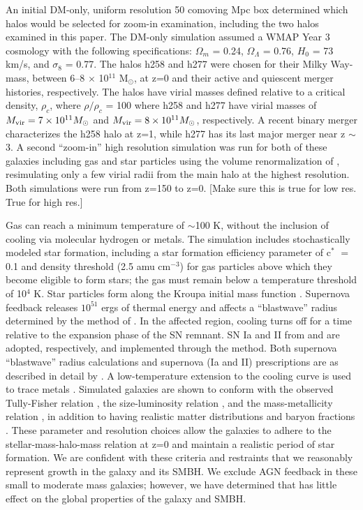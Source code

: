 \documentclass[manuscript]{aastex}
\begin{document}
An initial DM-only, uniform resolution 50 comoving Mpc box determined which halos would be selected for zoom-in examination, including the two halos examined in this paper. The DM-only simulation assumed a WMAP Year 3 cosmology \citep{Spergel2007} with the following specifications: $\Omega _m$ = 0.24, $\Omega _{\Lambda}$ = 0.76, $H_0$ = 73 km/s, and $\sigma _8$ = 0.77. The halos h258 and h277  were chosen for their Milky Way-mass, between 6--8 $\times$ 10$^{11}$  M$_{\odot}$, at z=0 and their active and quiescent merger histories, respectively. The halos have virial masses defined relative to a critical density, $\rho _c$, where $\rho / \rho _c$ = 100 where h258 and h277 have virial masses of $M_{\rm vir} = 7 \times 10^{11} M_{\odot}$ and $M_{\rm vir} = 8 \times 10^{11} M_{\odot}$, respectively. A recent binary merger characterizes the h258 halo at z=1, while h277 has its last major merger near z $\sim$ 3. A second ``zoom-in'' high resolution simulation was run for both of these galaxies including gas and star particles using the volume renormalization of \cite{Katz1993}, resimulating only a few virial radii from the main halo at the highest resolution. Both simulations were run from z=150 to z=0.  [Make sure this is true for low res. True for high res.]

Gas can reach a minimum temperature of $\sim$100 K, without the inclusion of cooling via molecular hydrogen or metals. The simulation includes stochastically modeled star formation, including a star formation efficiency parameter of c$^*$ $=$ 0.1 and density threshold (2.5 amu cm$^{-3}$) for gas particles above which they become eligible to form stars; the gas must remain below a temperature threshold of 10$^4$ K. Star particles form along the Kroupa initial mass function \citep{Kroupa2001}. Supernova feedback releases $10^{51}$ ergs of thermal energy and affects a ``blastwave'' radius determined by the method of \cite{Ostriker1988}. In the affected region, cooling turns off for a time relative to the expansion phase of the SN remnant. SN Ia and II from \cite{Thielemann1986} and \cite{Woosley1986} are adopted, respectively, and implemented through the \cite{Raiteri1996} method. Both supernova ``blastwave'' radius calculations and supernova (Ia and II) prescriptions are as described in detail by \cite{Stinson2006}. A low-temperature extension to the cooling curve is used to trace metals \citep{Bromm2001}. Simulated galaxies are shown to conform with the observed Tully-Fisher relation \citep{Governato2009}, the size-luminosity relation \citep{Brooks2011}, and the mass-metallicity relation \citep{Brooks2007}, in addition to having realistic matter distributions and baryon fractions \citep{Governato2009a,Guedes2011}. These parameter and resolution choices allow the galaxies to adhere to the stellar-mass-halo-mass relation at z=0 and maintain a realistic period of star formation. \citep{Moster2010,Munshi2013,Brooks2007,Maiolino2008} We are confident with these criteria and restraints that we reasonably represent growth in the galaxy and its SMBH. We exclude AGN feedback in these small to moderate mass galaxies; however, we have determined that has little effect on the global properties of the galaxy and SMBH.
 
\end{document}
